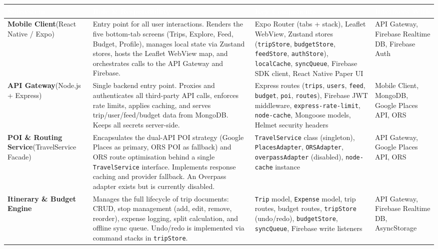 \documentclass[12pt, a4paper]{article}
\newcommand{\thcell}[1]{\textcolor{white}{\textbf{\small #1}}}
\begin{document}
\begin{longtable}{L{3.0cm} L{4.8cm} L{3.8cm} L{2.2cm}}
\toprule
{}
\thcell{Subsystem} & \thcell{Role \& Responsibility} &
\thcell{Key Components} & \thcell{Interfaces With} \\
\midrule
\endhead
\bottomrule
\endfoot

\textbf{Mobile Client}\newline(React Native / Expo) &
Entry point for all user interactions. Renders the five bottom-tab screens (Trips, Explore, Feed, Budget, Profile), manages local state via Zustand stores, hosts the Leaflet WebView map, and orchestrates calls to the API Gateway and Firebase. &
Expo Router (tabs + stack), Leaflet WebView, Zustand stores (\texttt{tripStore}, \texttt{budgetStore}, \texttt{feedStore}, \texttt{authStore}), \texttt{localCache}, \texttt{syncQueue}, Firebase SDK client, React Native Paper UI &
API Gateway, Firebase Realtime DB, Firebase Auth \\

\textbf{API Gateway}\newline(Node.js + Express) &
Single backend entry point. Proxies and authenticates all third-party API calls, enforces rate limits, applies caching, and serves trip/user/feed/budget data from MongoDB. Keeps all secrets server-side. &
Express routes (\texttt{trips}, \texttt{users}, \texttt{feed}, \texttt{budget}, \texttt{poi}, \texttt{routes}), Firebase JWT middleware, \texttt{express-rate-limit}, \texttt{node-cache}, Mongoose models, Helmet security headers &
Mobile Client, MongoDB, Google Places API, ORS \\

\textbf{POI \& Routing Service}\newline(TravelService Facade) &
Encapsulates the dual-API POI strategy (Google Places as primary, ORS POI as fallback) and ORS route optimisation behind a single \texttt{TravelService} interface. Implements response caching and provider fallback. An Overpass adapter exists but is currently disabled. &
\texttt{TravelService} class (singleton), \texttt{PlacesAdapter}, \texttt{ORSAdapter}, \texttt{overpassAdapter} (disabled), \texttt{node-cache} instance &
API Gateway, Google Places API, ORS \\

\textbf{Itinerary \& Budget Engine} &
Manages the full lifecycle of trip documents: CRUD, stop management (add, edit, remove, reorder), expense logging, split calculation, and offline sync queue. Undo/redo is implemented via command stacks in \texttt{tripStore}. &
\texttt{Trip} model, \texttt{Expense} model, trip routes, budget routes, \texttt{tripStore} (undo/redo), \texttt{budgetStore}, \texttt{syncQueue}, Firebase write listeners &
API Gateway, Firebase Realtime DB, AsyncStorage \\


\end{longtable}
\end{document}
